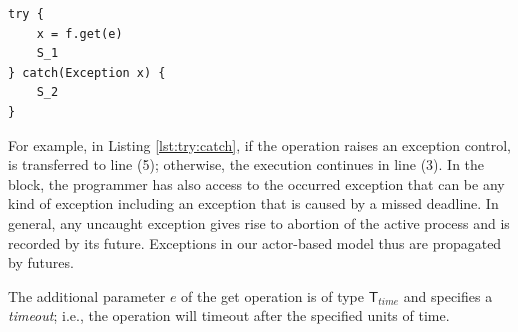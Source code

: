 \begin{lstlisting}[float=h, label=lst:try:catch, caption=Using try-catch for processing future values]
try {
	x = f.get(e)
	S_1
} catch(Exception x) {
	S_2
}
\end{lstlisting}

For example, in Listing \ref{lst:try:catch}, if the \gett \space operation raises an exception  control,  is transferred to line (5);
otherwise, the execution continues in line (3). 
In the  block, the programmer has also access to the occurred exception that can be 
any kind of exception including an exception that is caused by a missed deadline.
In general, any uncaught exception gives rise to abortion of the active process and is recorded by its future.
Exceptions in our actor-based model thus are propagated by futures.

The additional parameter $e$ of the get operation is of type  $\mathsf{T}_{time}$ and specifies a \emph{timeout};
i.e., the \gett \space operation will timeout after the specified units of time.




